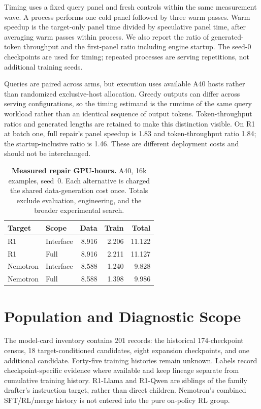 Timing uses a fixed query panel and fresh controls within the same measurement wave. A process performs one cold panel followed by three warm passes. Warm speedup is the target-only panel time divided by speculative panel time, after averaging warm passes within process. We also report the ratio of generated-token throughput and the first-panel ratio including engine startup. The seed-0 checkpoints are used for timing; repeated processes are serving repetitions, not additional training seeds.

Queries are paired across arms, but execution uses available A40 hosts rather than randomized exclusive-host allocation. Greedy outputs can differ across serving configurations, so the timing estimand is the runtime of the same query workload rather than an identical sequence of output tokens. Token-throughput ratios and generated lengths are retained to make this distinction visible. On R1 at batch one, full repair's panel speedup is 1.83 and token-throughput ratio 1.84; the startup-inclusive ratio is 1.46. These are different deployment costs and should not be interchanged.

\begin{table}[t]
\centering\small
\begin{tabular}{@{}llrrr@{}}
\toprule
Target & Scope & Data & Train & Total \\
\midrule
R1 & Interface & 8.916 & 2.206 & 11.122 \\
R1 & Full & 8.916 & 2.211 & 11.127 \\
Nemotron & Interface & 8.588 & 1.240 & 9.828 \\
Nemotron & Full & 8.588 & 1.398 & 9.986 \\
\bottomrule
\end{tabular}
\caption{\textbf{Measured repair GPU-hours.} A40, 16k examples, seed~0. Each alternative is charged the shared data-generation cost once. Totals exclude evaluation, engineering, and the broader experimental search.}
\label{tab:cost}
\end{table}

\section{Population and Diagnostic Scope}
\label{app:population}
The model-card inventory contains 201 records: the historical 174-checkpoint census, 18 target-conditioned candidates, eight expansion checkpoints, and one additional candidate. Forty-five training histories remain unknown. Labels record checkpoint-specific evidence where available and keep lineage separate from cumulative training history. R1-Llama and R1-Qwen are siblings of the family drafter's instruction target, rather than direct children. Nemotron's combined SFT/RL/merge history is not entered into the pure on-policy RL group.


